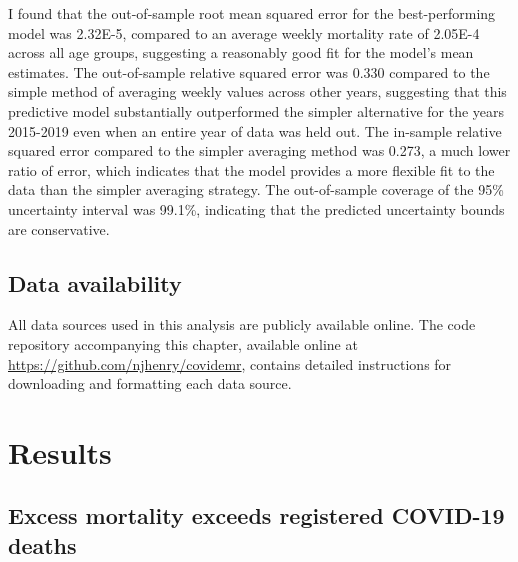 \documentclass[
]{article}
\begin{document}
I found that the out-of-sample root mean squared error for the best-performing model was 2.32E-5, compared to an average weekly mortality rate of 2.05E-4 across all age groups, suggesting a reasonably good fit for the model's mean estimates. The out-of-sample relative squared error was 0.330 compared to the simple method of averaging weekly values across other years, suggesting that this predictive model substantially outperformed the simpler alternative for the years 2015-2019 even when an entire year of data was held out. The in-sample relative squared error compared to the simpler averaging method was 0.273, a much lower ratio of error, which indicates that the model provides a more flexible fit to the data than the simpler averaging strategy. The out-of-sample coverage of the 95\% uncertainty interval was 99.1\%, indicating that the predicted uncertainty bounds are conservative.

\hypertarget{data-availability}{%
\subsection{Data availability}\label{data-availability}}

All data sources used in this analysis are publicly available online. The code repository accompanying this chapter, available online at \url{https://github.com/njhenry/covidemr}, contains detailed instructions for downloading and formatting each data source.

\hypertarget{results}{%
\section{Results}\label{results}}

\hypertarget{excess-mortality-exceeds-registered-covid-19-deaths}{%
\subsection{Excess mortality exceeds registered COVID-19 deaths}\label{excess-mortality-exceeds-registered-covid-19-deaths}}
\end{document}
